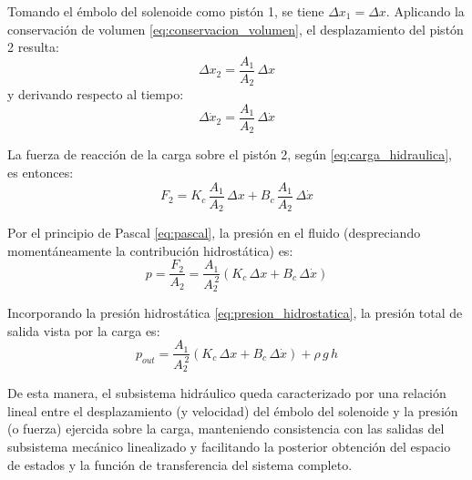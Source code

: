 \documentclass[journal]{IEEEtran}
\begin{document}
\setlength{\parskip}{1em}

Tomando el émbolo del solenoide como pistón 1, se tiene $\Delta x_1 = \Delta x$. 
Aplicando la conservación de volumen \eqref{eq:conservacion_volumen}, el 
desplazamiento del pistón 2 resulta:
\begin{equation}
    \Delta x_2 = \frac{A_1}{A_2} \, \Delta x
\label{eq:desplazamiento_pisto2}
\end{equation}
y derivando respecto al tiempo:
\begin{equation}
    \Delta \dot{x}_2 = \frac{A_1}{A_2} \, \Delta \dot{x}
\label{eq:velocidad_piston2}
\end{equation}

La fuerza de reacción de la carga sobre el pistón 2, según 
\eqref{eq:carga_hidraulica}, es entonces:
\begin{equation}
    F_2 = K_c \, \frac{A_1}{A_2} \, \Delta x 
        + B_c \, \frac{A_1}{A_2} \, \Delta \dot{x}
\label{eq:fuerza_piston2}
\end{equation}

Por el principio de Pascal \eqref{eq:pascal}, la presión en el fluido 
(despreciando momentáneamente la contribución hidrostática) es:
\begin{equation}
    p = \frac{F_2}{A_2} = \frac{A_1}{A_2^{\,2}} 
        \left( K_c \, \Delta x + B_c \, \Delta \dot{x} \right)
\label{eq:presion_pascal}
\end{equation}

Incorporando la presión hidrostática \eqref{eq:presion_hidrostatica}, la 
presión total de salida vista por la carga es:
\begin{equation}
    {\,p_{out} = \frac{A_1}{A_2^{\,2}} 
        \left( K_c \, \Delta x + B_c \, \Delta \dot{x} \right) 
        + \rho \, g \, h \,}
\label{eq:presion_salida}
\end{equation}


\setlength{\parskip}{1em}

De esta manera, el subsistema hidráulico queda caracterizado por una relación 
lineal entre el desplazamiento (y velocidad) del émbolo del solenoide y la 
presión (o fuerza) ejercida sobre la carga, manteniendo consistencia con las 
salidas del subsistema mecánico linealizado y facilitando la posterior 
obtención del espacio de estados y la función de transferencia del sistema 
completo.

\end{document}
